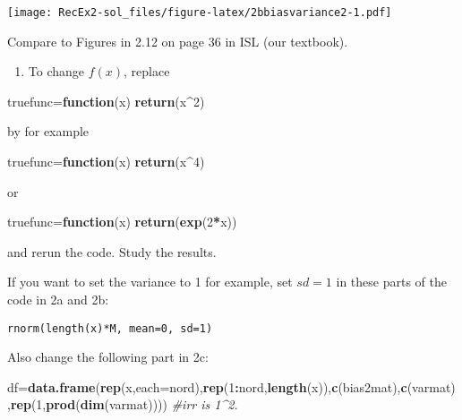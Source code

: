 \documentclass[]{article}
\newenvironment{Shaded}{\begin{snugshade}}{\end{snugshade}}
\newcommand{\CommentTok}[1]{\textcolor[rgb]{0.56,0.35,0.01}{\textit{#1}}}
\newcommand{\ControlFlowTok}[1]{\textcolor[rgb]{0.13,0.29,0.53}{\textbf{#1}}}
\newcommand{\DataTypeTok}[1]{\textcolor[rgb]{0.13,0.29,0.53}{#1}}
\newcommand{\DecValTok}[1]{\textcolor[rgb]{0.00,0.00,0.81}{#1}}
\newcommand{\KeywordTok}[1]{\textcolor[rgb]{0.13,0.29,0.53}{\textbf{#1}}}
\newcommand{\NormalTok}[1]{#1}
\newcommand{\OperatorTok}[1]{\textcolor[rgb]{0.81,0.36,0.00}{\textbf{#1}}}
\providecommand{\tightlist}{%
  \setlength{\itemsep}{0pt}\setlength{\parskip}{0pt}}
\begin{document}
\texttt{[image: RecEx2-sol\_files/figure-latex/2bbiasvariance2-1.pdf]}

Compare to Figures in 2.12 on page 36 in ISL (our textbook).

\begin{enumerate}
\def\labelenumi{\alph{enumi})}
\setcounter{enumi}{3}
\tightlist
\item
  To change \(f(x)\), replace
\end{enumerate}

\begin{Shaded}
\begin{Highlighting}[]
\NormalTok{truefunc=}\ControlFlowTok{function}\NormalTok{(x) }\KeywordTok{return}\NormalTok{(x}\OperatorTok{^}\DecValTok{2}\NormalTok{)}
\end{Highlighting}
\end{Shaded}

by for example

\begin{Shaded}
\begin{Highlighting}[]
\NormalTok{truefunc=}\ControlFlowTok{function}\NormalTok{(x) }\KeywordTok{return}\NormalTok{(x}\OperatorTok{^}\DecValTok{4}\NormalTok{)}
\end{Highlighting}
\end{Shaded}

or

\begin{Shaded}
\begin{Highlighting}[]
\NormalTok{truefunc=}\ControlFlowTok{function}\NormalTok{(x) }\KeywordTok{return}\NormalTok{(}\KeywordTok{exp}\NormalTok{(}\DecValTok{2}\OperatorTok{*}\NormalTok{x))}
\end{Highlighting}
\end{Shaded}

and rerun the code. Study the results.

If you want to set the variance to 1 for example, set \(sd=1\) in these
parts of the code in 2a and 2b:

\begin{verbatim}
rnorm(length(x)*M, mean=0, sd=1)
\end{verbatim}

Also change the following part in 2c:

\begin{Shaded}
\begin{Highlighting}[]
\NormalTok{df=}\KeywordTok{data.frame}\NormalTok{(}\KeywordTok{rep}\NormalTok{(x,}\DataTypeTok{each=}\NormalTok{nord),}\KeywordTok{rep}\NormalTok{(}\DecValTok{1}\OperatorTok{:}\NormalTok{nord,}\KeywordTok{length}\NormalTok{(x)),}\KeywordTok{c}\NormalTok{(bias2mat),}\KeywordTok{c}\NormalTok{(varmat),}\KeywordTok{rep}\NormalTok{(}\DecValTok{1}\NormalTok{,}\KeywordTok{prod}\NormalTok{(}\KeywordTok{dim}\NormalTok{(varmat)))) }\CommentTok{#irr is 1^2.}
\end{Highlighting}
\end{Shaded}
\end{document}

